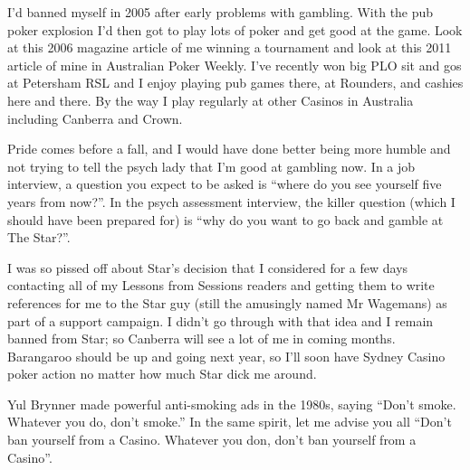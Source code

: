 I'd banned myself in 2005 after early problems with gambling.
With the pub poker explosion I'd then got to play lots of poker and
get good at the game. Look at this 2006 magazine article of me winning
a tournament and look at this 2011 article of mine in Australian Poker
Weekly. I've recently won big PLO sit and gos at Petersham RSL and I
enjoy playing pub games there, at Rounders, and cashies here and
there. By the way I play regularly at other Casinos in Australia
including Canberra and Crown.

Pride comes before a fall, and I would have done better being more
humble and not trying to tell the psych lady that I'm good at gambling
now. In a job interview, a question you expect to be asked is ``where
do you see yourself five years from now?''. In the psych assessment
interview, the killer question (which I should have been prepared for)
is ``why do you want to go back and gamble at The Star?''.

I was so pissed off about Star's decision that I considered for a few
days contacting all of my Lessons from Sessions readers and getting
them to write references for me to the Star guy (still the amusingly
named Mr Wagemans) as part of a support campaign. I didn't go through
with that idea and I remain banned from Star; so Canberra will see a
lot of me in coming months. Barangaroo should be up and going next
year, so I'll soon have Sydney Casino poker action no matter how much
Star dick me around.

Yul Brynner made powerful anti-smoking ads in the 1980s, saying
``Don't smoke. Whatever you do, don't smoke.'' In the same spirit, let
me advise you all ``Don't ban yourself from a Casino. Whatever you
don, don't ban yourself from a Casino''.







